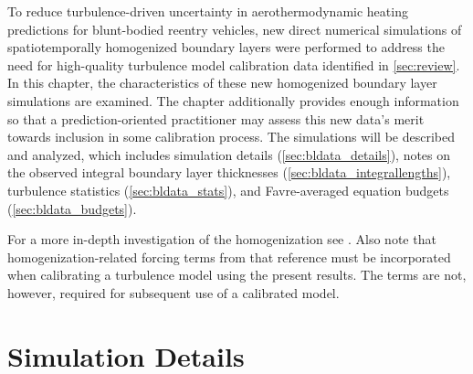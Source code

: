 \label{sec:bldata}

To reduce turbulence-driven uncertainty in aerothermodynamic heating predictions
for blunt-bodied reentry vehicles, new direct numerical simulations of
spatiotemporally homogenized boundary layers were performed to address the need
for high-quality turbulence model calibration data identified in
\autoref{sec:review}.
%
In this chapter, the characteristics of these new homogenized boundary layer
simulations are examined.
%
The chapter additionally provides enough information so that a
prediction-oriented practitioner may assess this new data's merit towards
inclusion in some calibration process.
%
The simulations will be described and analyzed, which includes
simulation details (\autoref{sec:bldata_details}), notes on the observed
integral boundary layer thicknesses (\autoref{sec:bldata_integrallengths}), turbulence
statistics (\autoref{sec:bldata_stats}), and Favre-averaged equation budgets
(\autoref{sec:bldata_budgets}).

For a more in-depth investigation of the homogenization see
\citet{Topalian2014Spatiotemporal}.
%
Also note that homogenization-related forcing terms from that reference must
be incorporated when calibrating a turbulence model using the present results.
The terms are not, however, required for subsequent use of a calibrated model.


\section{Simulation Details}
\label{sec:bldata_details}

